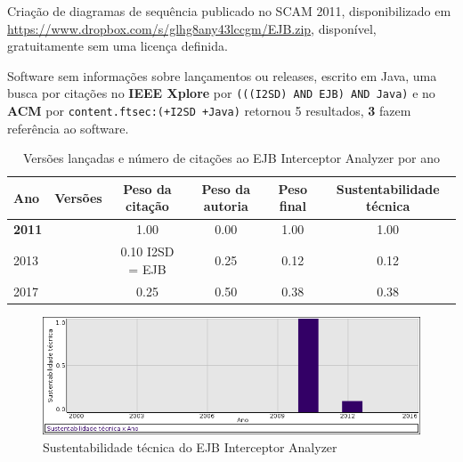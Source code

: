 Criação de diagramas de sequência
publicado no SCAM 2011,
disponibilizado em \url{https://www.dropbox.com/s/glhg8any43lccgm/EJB.zip},
disponível,
gratuitamente
sem uma licença definida.

Software sem informações sobre lançamentos ou releases,
escrito em Java,
uma busca por citações no {\bf IEEE Xplore} por
\texttt{(((I2SD) AND EJB) AND Java)}
e no {\bf ACM} por
\texttt{content.ftsec:(+I2SD +Java)}
retornou
5 resultados,
{\bf 3} fazem referência ao software.


\begin{table}[H]
\caption{Versões lançadas e número de citações ao EJB Interceptor Analyzer por ano}
\centering
\begin{tabular}{| l | c | c | c | c | c |}
  \hline
  Ano & Versões & Peso da citação & Peso da autoria & Peso final & Sustentabilidade técnica \\
  \hline
            {\bf 2011}
          &
          
          &
          1.00
          &
          0.00
          &
          1.00
          &
            {\color{blue} 1.00}
          \\
\hline
            2013
          &
          
          &
          0.10
            {\tiny I2SD = EJB}
          &
          0.25
          &
          0.12
          &
            {\color{red} 0.12}
          \\
\hline
            2017
          &
          
          &
          0.25
          &
          0.50
          &
          0.38
          &
            {\color{red} 0.38}
          \\
\hline
\end{tabular}
\end{table}

\begin{figure}[h]
  \center
  \includegraphics[scale=0.50]{imagens/softwares-charts/ejb.png}
  \caption{Sustentabilidade técnica do EJB Interceptor Analyzer}
\end{figure}



